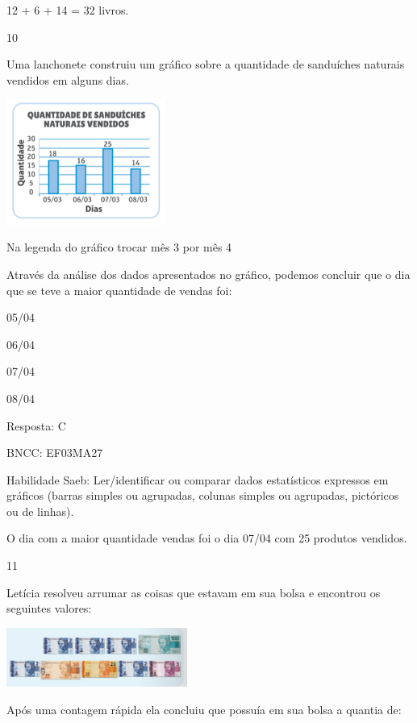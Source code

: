 \begin{escolha}
12 + 6 + 14 = 32 livros.

\num{10}

Uma lanchonete construiu um gráfico sobre a quantidade de sanduíches
naturais vendidos em alguns dias.

\includegraphics[width=2.05128in,height=1.61850in]{media/image124.png}

Na legenda do gráfico trocar mês 3 por mês 4

Através da análise dos dados apresentados no gráfico, podemos concluir
que o dia que se teve a maior quantidade de vendas foi:

\begin{escolha}

\item
  05/04
\item
  06/04
\item
  07/04
\item
  08/04
\end{escolha}

Resposta: C

BNCC: EF03MA27

Habilidade Saeb: Ler/identificar ou comparar dados estatísticos
expressos em gráficos (barras simples ou agrupadas, colunas simples ou
agrupadas, pictóricos ou de linhas).

O dia com a maior quantidade vendas foi o dia 07/04 com 25 produtos
vendidos.

\num{11}

Letícia resolveu arrumar as coisas que estavam em sua bolsa e encontrou
os seguintes valores:

\includegraphics[width=2.33354in,height=0.76673in]{media/image125.png}

Após uma contagem rápida ela concluiu que possuía em sua bolsa a quantia
de:

\begin{escolha}


\end{escolha}
\end{escolha}
